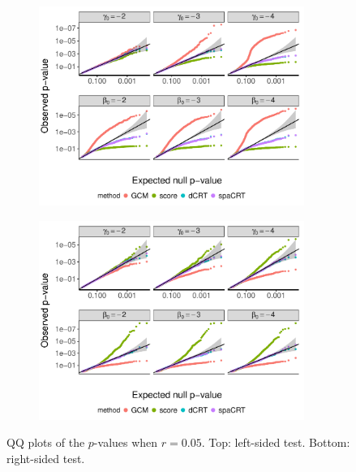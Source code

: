 \documentclass[12pt]{article}
\theoremstyle{definition}
\begin{document}
  \begin{figure}[!ht]
	\centering
	\begin{subfigure}{\textwidth}
		\centering
		\includegraphics[width=0.95\textwidth]{figures-and-tables/simulation/NB-regression/QQ/disp-0.05-QQ-LEFT.pdf}
	\end{subfigure}

	\begin{subfigure}{\textwidth}
		\centering
		\includegraphics[width=0.95\textwidth]{figures-and-tables/simulation/NB-regression/QQ/disp-0.05-QQ-RIGHT.pdf}
	\end{subfigure}
	\caption{QQ plots of the $p$-values when $r=0.05$. Top: left-sided test. Bottom: right-sided test. }
	\label{fig:simulation-CRISPR-screens-disp-0.05-QQ}
  \end{figure}
  
\end{document}
